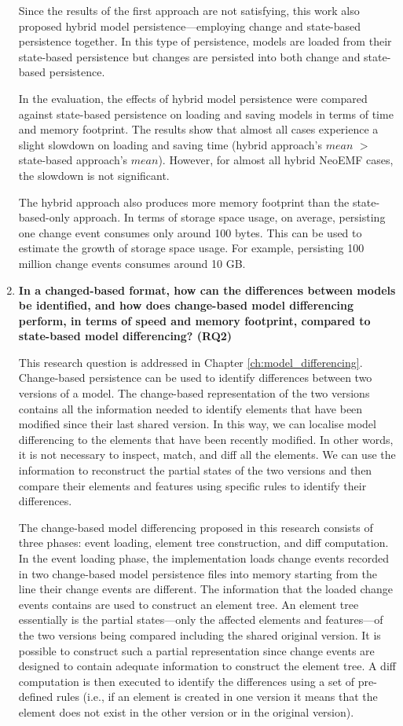 \begin{enumerate}
  Since the results of the first approach are not satisfying, this work also proposed hybrid model persistence—employing change and state-based persistence together. In this type of persistence, models are loaded from their state-based persistence but changes are persisted into both change and state-based persistence.
  
  In the evaluation, the effects of hybrid model persistence were compared against state-based persistence on loading and saving models in terms of time and memory footprint. The results show that almost all cases experience a slight slowdown on loading and saving time (hybrid approach’s $mean$ $>$ state-based approach’s $mean$). However, for almost all hybrid NeoEMF cases, the slowdown is not significant.
  
  The hybrid approach also produces more memory footprint than the state-based-only approach. In terms of storage space usage, on average, persisting one change event consumes only around 100 bytes. This can be used to estimate the growth of storage space usage. For example, persisting 100 million change events consumes around 10 GB.
  
  \item \textbf{In a changed-based format, how can the differences between models be identified, and how does change-based model differencing perform, in terms of speed and memory footprint, compared to state-based model differencing? (RQ2)}
  
  This research question is addressed in Chapter \ref{ch:model_differencing}. Change-based persistence can be used to identify differences between two versions of a model. The change-based representation of the two versions contains all the information needed to identify elements that have been modified since their last shared version. In this way, we can localise model differencing to the elements that have been recently modified. In other words, it is not necessary to inspect,  match, and diff all the elements. We can use the information to reconstruct the partial states of the two versions and then compare their elements and features using specific rules to identify their differences.
  
  The change-based model differencing proposed in this research consists of three phases: event loading, element tree construction, and diff computation. In the event loading phase, the implementation loads change events recorded in two change-based model persistence files into memory starting from the line their change events are different. The information that the loaded change events contains are used to construct an element tree. An element tree essentially is the partial states—only the affected elements and features—of the two versions being compared including the shared original version. It is possible to construct such a partial representation since change events are designed to contain adequate information to construct the element tree. A diff computation is then executed to identify the differences using a set of pre-defined rules (i.e., if an element is created in one version it means that the element does not exist in the other version or in the original version).
  

\end{enumerate}
